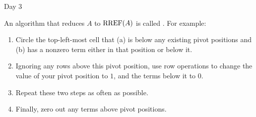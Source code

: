 
\begin{applicationActivities}{Day 3}

\begin{definition}
  An algorithm that reduces \(A\) to \(\operatorname{RREF}(A)\) is called
  . For example:
  \begin{multicols}{3}
    \begin{enumerate}
      \item Circle the top-left-most cell that (a) is below any existing pivot
      positions and (b) has a nonzero term either in that position or below it.
      \item Ignoring any rows above this pivot position, use row operations
      to change the value of your pivot position to \(1\), and the terms below
      it to \(0\).
      \item Repeat these two steps as often as possible.
      \item Finally,
      zero out any terms above pivot positions.
    \end{enumerate}
  \end{multicols}
\end{definition}


\end{applicationActivities}

